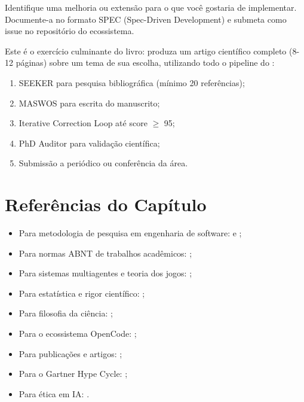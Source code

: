 \begin{exercicio}
    Identifique uma melhoria ou extensão para o \opencodeeco{} que você
    gostaria de implementar. Documente-a no formato SPEC (Spec-Driven
    Development) e submeta como issue no repositório do ecossistema.
\end{exercicio}

\begin{exercicio}
    Este é o exercício culminante do livro: produza um artigo científico
    completo (8-12 páginas) sobre um tema de sua escolha, utilizando todo
    o pipeline do \opencodeeco{}:
    \begin{enumerate}
    \item SEEKER para pesquisa bibliográfica (mínimo 20 referências);
    \item MASWOS para escrita do manuscrito;
    \item Iterative Correction Loop até score $\geq$ 95;
    \item PhD Auditor para validação científica;
    \item Submissão a periódico ou conferência da área.
    \end{enumerate}
\end{exercicio}

\section*{Referências do Capítulo}

\begin{itemize}
\item Para metodologia de pesquisa em engenharia de software:
      \cite{sommerville2011engenharia} e \cite{sommerville2011engenharia};
\item Para normas ABNT de trabalhos acadêmicos:
      \cite{abnt2023nbr14724, abnt2023nbr6023, abnt2023nbr10520};
\item Para sistemas multiagentes e teoria dos jogos:
      \cite{wooldridge2009multiagent, weiss2013multiagent, nash1950equilibrium};
\item Para estatística e rigor científico:
      \cite{wasserman2004all, cohen2018estatistica, bonferroni1936teoria};
\item Para filosofia da ciência:
      \cite{popper2005logica, kuhn1998estrutura};
\item Para o ecossistema OpenCode:
      \cite{opencode2026ecosystem, opencode2026spec036, opencode2026spec038,
      opencode2026maswos, opencode2026seeker, opencode2026cora};
\item Para publicações e artigos:
      \cite{laranjeira2026opencode, laranjeira2026gartner,
      laranjeira2026cora, laranjeira2026trust};
\item Para o Gartner Hype Cycle:
      \cite{gartner2026hype};
\item Para ética em IA:
      \cite{bender2021dangers, gebru2021datasheets}.
\end{itemize}

